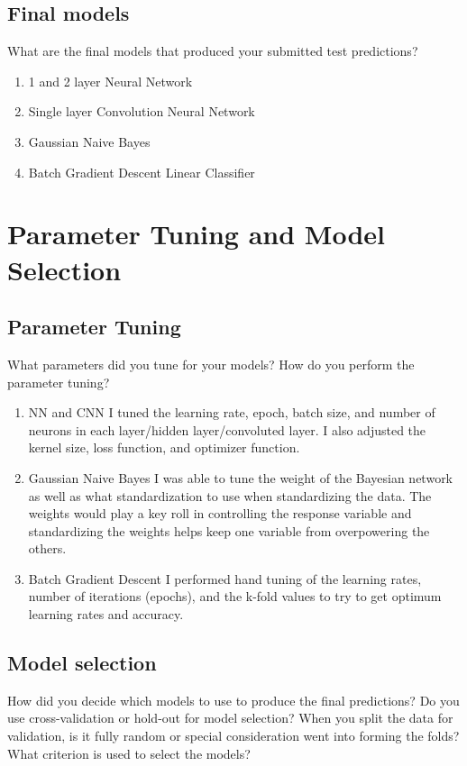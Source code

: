 \documentclass[11pt,a4paper]{article}
\begin{document}
\subsection{Final models}
What are the final models that produced your submitted test predictions?
\begin{enumerate}
	\item 1 and 2 layer Neural Network
	\item Single layer Convolution Neural Network
	\item Gaussian Naive Bayes
	\item Batch Gradient Descent Linear Classifier
\end{enumerate}

\section{Parameter Tuning and Model Selection }
\subsection{Parameter Tuning}
What parameters did you tune for your models? How do you perform the parameter tuning?
\begin{enumerate}
	\item NN and CNN
		\subitem
		I tuned the learning rate, epoch, batch size, and number of neurons in each layer/hidden layer/convoluted layer.
		I also adjusted the kernel size, loss function, and optimizer function.
		
	\item Gaussian Naive Bayes
	    \subitem
	    I was able to tune the weight of the Bayesian network as well as what standardization to use when standardizing the data.
	    The weights would play a key roll in controlling the response variable and standardizing the weights helps keep one variable from overpowering the others.
	    
	 \item Batch Gradient Descent
	   \subitem
	   I performed hand tuning of the learning rates, number of iterations (epochs), and the k-fold values to try to get optimum learning rates and accuracy.
\end{enumerate}


\subsection{Model selection}
How did you decide which models to use to produce the final predictions?  Do you use cross-validation or hold-out for model selection? When you split the data for validation, is it fully random or special consideration went into forming the folds? What criterion is used to select the models?
\end{document}
